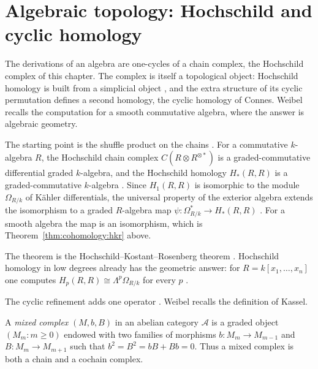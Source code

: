 \section{Algebraic topology: Hochschild and cyclic homology}\label{sec:cohomology:algebraic-topology}

The derivations of an algebra are one-cycles of a chain complex, the
Hochschild complex of this chapter. The complex is itself a
topological object: Hochschild homology is built from a simplicial object
\cite[\S9.6]{Weibel1994},
and the extra structure of its cyclic permutation defines a second homology,
the cyclic homology of Connes. Weibel recalls the computation for a smooth
commutative algebra, where the answer is algebraic geometry.

The starting point is the shuffle product on the chains \cite[\S9.4.1]{Weibel1994}. For a commutative
$k$-algebra $R$, the Hochschild chain complex $C(R\otimes R^{\otimes\ast})$
is a graded-commutative differential graded $k$-algebra, and the Hochschild
homology $H_*(R,R)$ is a graded-commutative $k$-algebra
\cite[Proposition~9.4.2, p.~321]{Weibel1994}. Since $H_1(R,R)$ is isomorphic
to the module $\Omega_{R/k}$ of K\"ahler differentials, the universal
property of the exterior algebra extends the isomorphism to a graded
$R$-algebra map $\psi\colon\Omega^*_{R/k}\to H_*(R,R)$
\cite[Corollary~9.4.4, p.~322]{Weibel1994}. For a smooth algebra the map is
an isomorphism, which is Theorem~\ref{thm:cohomology:hkr} above.

The theorem is the Hochschild--Kostant--Rosenberg theorem \cite[9.4.7]{Weibel1994}. Hochschild
homology in low degrees already has the geometric answer: for
$R=k[x_1,\ldots,x_n]$ one computes $H_p(R,R)\cong
\Lambda^p\Omega_{R/k}$ for every $p$
\cite[Exercise~9.1.3, p.~304]{Weibel1994}.

The cyclic refinement adds one operator \cite[\S9.8]{Weibel1994}. Weibel recalls the definition of
Kassel.

\begin{definition}\label{def:cohomology:mixed-complex}
A \emph{mixed complex} $(M,b,B)$ in an abelian category
$\mathcal{A}$ is a graded object $(M_m\colon m\geq0)$ endowed with two
families of morphisms $b\colon M_m\to M_{m-1}$ and $B\colon M_m\to M_{m+1}$
such that $b^2=B^2=bB+Bb=0$. Thus a mixed complex is both a chain and a
cochain complex.
\end{definition}

